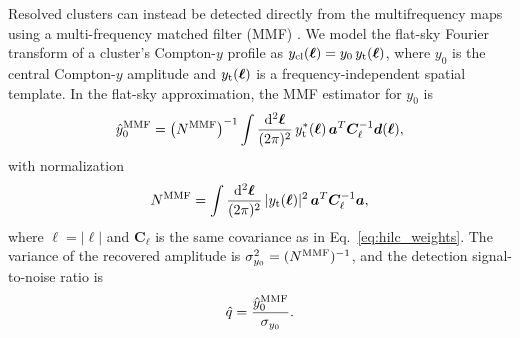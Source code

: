 \documentclass[aps,prd,twocolumn,superscriptaddress,nofootinbib,floatfix]{revtex4-2}
\begin{document}
Resolved clusters can instead be detected directly from the multifrequency maps using a multi-frequency matched filter (MMF) \citep{Melin2006,2023MNRAS.522.5123Z}. We model the flat-sky Fourier transform of a cluster's Compton-$y$ profile as $y_{\rm cl}(\bm{\ell})=y_0\,y_{\rm t}(\bm{\ell})$, where $y_0$ is the central Compton-$y$ amplitude and $y_{\rm t}(\bm{\ell})$ is a frequency-independent spatial template. In the flat-sky approximation, the MMF estimator for $y_0$ is
\begin{equation}
\hat{y}_0^{\rm MMF}
=
\left(N^{\rm MMF}\right)^{-1}
\int
\frac{\mathrm{d}^2\bm{\ell}}{(2\pi)^2}\,
y_{\rm t}^{*}(\bm{\ell})\,
\bm{a}^{T}
\bm{C}_{\ell}^{-1}
\bm{d}(\bm{\ell}),
\label{eq:mmf_estimator}
\end{equation}
with normalization
\begin{equation}
N^{\rm MMF}
=
\int
\frac{\mathrm{d}^2\bm{\ell}}{(2\pi)^2}\,
|y_{\rm t}(\bm{\ell})|^2\,
\bm{a}^{T}
\bm{C}_{\ell}^{-1}
\bm{a},
\label{eq:mmf_normalization}
\end{equation}
where $\ell=|\bm{\ell}|$ and $\bm{C}_{\ell}$ is the same covariance as in Eq.~\eqref{eq:hilc_weights}. The variance of the recovered amplitude is $\sigma_{y_0}^2=(N^{\rm MMF})^{-1}$, and the detection signal-to-noise ratio is
\begin{equation}
\hat{q}
=
\frac{\hat{y}_0^{\rm MMF}}{\sigma_{y_0}}.
\label{eq:mmf_snr}
\end{equation}
\end{document}
